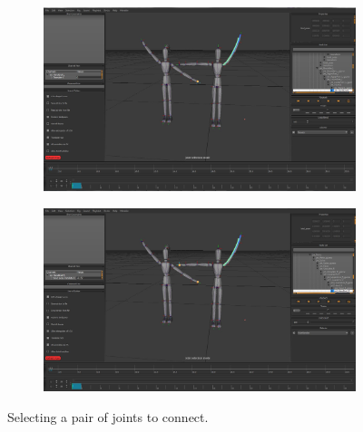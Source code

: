 \begin{figure}[H]
	\centering
        \begin{subfigure}[b!]{0.45\textwidth}
        	\centering
                \includegraphics[width=\linewidth]{img/ui5}
        \end{subfigure}
        \quad
        \begin{subfigure}[b!]{0.45\textwidth}
        	\centering
                \includegraphics[width=\linewidth]{img/ui6}
        \end{subfigure}%
        \caption{Selecting a pair of joints to connect.}
	\label{fig:correspondence}
\end{figure}
